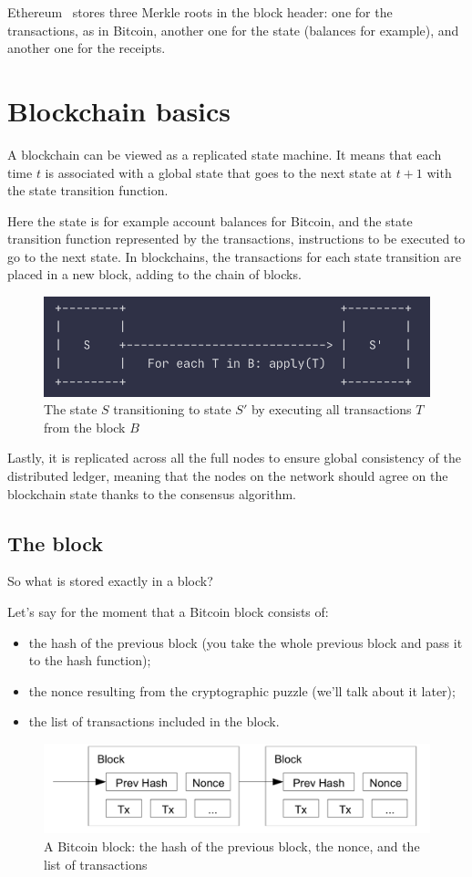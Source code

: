 Ethereum~\cite{Buterin..13} stores three Merkle roots in the block header: one for the transactions, as in Bitcoin, another one for the state (balances for example), and another one for the receipts. 


\section{Blockchain basics}

A blockchain can be viewed as a replicated state machine. It means that  each time $t$ is associated with a global state that goes to the next state at $t+1$ with the state transition function. 

Here the state is for example account balances for Bitcoin, and the state transition function represented by the transactions, instructions to be executed to go to the next state.
In blockchains, the transactions for each state transition are placed in a new block, adding to the chain of blocks.
\begin{figure}[H]
\centering
\includegraphics[width=0.6\linewidth]{background/state_transition.png}
    \caption{The state $S$ transitioning to state $S'$ by executing all transactions $T$ from the block $B$ \cite{statemachine}}
    \label{fig:state_transition}
\end{figure}
Lastly, it is replicated across all the full nodes to ensure global consistency of the distributed ledger, meaning that the nodes on the network should agree on the blockchain state thanks to the consensus algorithm.

\subsection{The block}
So what is stored exactly in a block? 

Let's say for the moment that a Bitcoin block consists of:
\begin{itemize}
    \item the hash of the previous block (you take the whole previous block and pass it to the hash function);
    \item the nonce resulting from the cryptographic puzzle (we'll talk about it later); 
    \item the list of transactions included in the block.
\end{itemize}
\begin{figure}[H]
    \centering
\includegraphics[width=0.6\linewidth]{background/block.png}
    \caption{A Bitcoin block: the hash of the previous block, the nonce, and the list of transactions \cite{Nakamoto..09}}
    \label{fig:block}
\end{figure}

